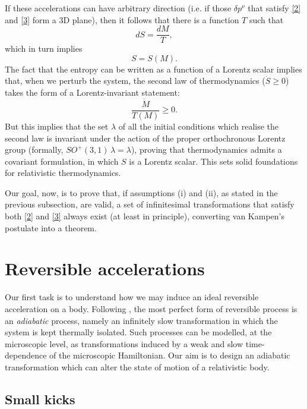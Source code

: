 \documentclass[twocolumn,usenatbib]{mnras2}
\begin{document}
If these accelerations can have arbitrary direction (i.e. if those $\delta p^\nu$ that satisfy \eqref{2} and \eqref{3} form a 3D plane), then it follows that there is a function $T$ such that
\begin{equation}
dS = \dfrac{dM}{T},
\end{equation}
which in turn implies
\begin{equation}
S=S(M).
\end{equation}
The fact that the entropy can be written as a function of a Lorentz scalar implies that, when we perturb the system, the second law of thermodynamics ($\dot{S} \geq 0$) takes the form of a Lorentz-invariant statement:
\begin{equation}
\dfrac{\dot{M}}{T(M)} \geq 0.
\end{equation}
But this implies that the set $\lambda$ of all the initial conditions which realise the second law is invariant under the action of the proper orthochronous Lorentz group (formally, $SO^+(3,1) \, \lambda = \lambda$), proving that thermodynamics admits a covariant formulation, in which $S$ is a Lorentz scalar. This sets solid foundations for relativistic thermodynamics.

Our goal, now, is to prove that, if assumptions (i) and (ii), as stated in the previous subsection, are valid, a set of infinitesimal transformations that satisfy both \eqref{2} and \eqref{3} always exist (at least in principle), converting van Kampen's postulate into a theorem. 



\section{Reversible accelerations}

Our first task is to understand how we may induce an ideal reversible acceleration on a body. Following \cite{landau5}, the most perfect form of reversible process is an \textit{adiabatic} process, namely an infinitely slow transformation in which the system is kept thermally isolated. Such processes can be modelled, at the microscopic level, as transformations induced by a weak and slow time-dependence of the microscopic Hamiltonian. Our aim is to design an adiabatic transformation which can alter the state of motion of a relativistic body. 

\subsection{Small kicks} 
\end{document}
